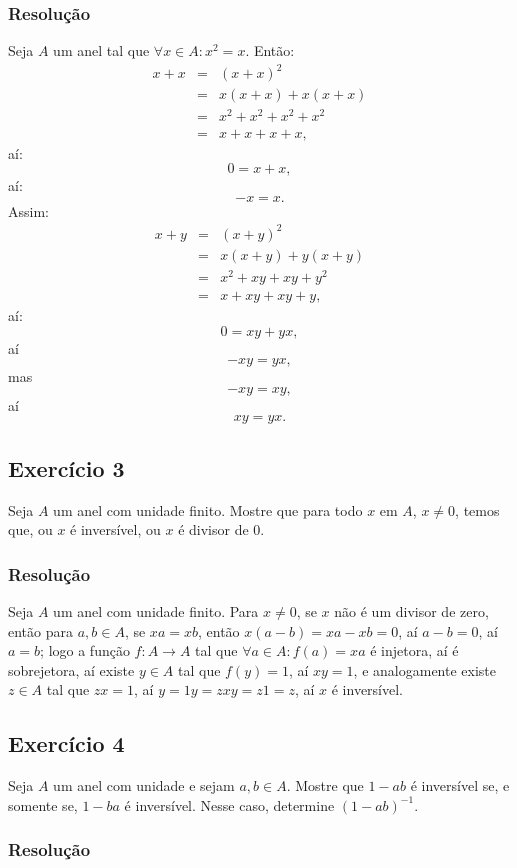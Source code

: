 \documentclass[10pt,a4paper]{article}
\begin{document}
\subsubsection*{Resolução}

Seja $A$ um anel tal que $\forall x\in A:x^2=x$. Então:
\[
\begin{array}{rcl}
x+x&=&(x+x)^2\\&=&x(x+x)+x(x+x)\\&=&x^2+x^2+x^2+x^2\\&=&x+x+x+x,
\end{array}
\]
aí:
\[
0=x+x,
\]
aí:
\[
-x=x.
\]
Assim:
\[
\begin{array}{rcl}
x+y&=&(x+y)^2\\&=&x(x+y)+y(x+y)\\&=&x^2+xy+xy+y^2\\&=&x+xy+xy+y,
\end{array}
\]
aí:
\[
0=xy+yx,
\]
aí
\[
-xy=yx,
\]
mas
\[
-xy=xy,
\]
aí
\[
xy=yx.
\]

\newpage

\subsection*{Exercício 3}
Seja $A$ um anel com unidade finito. Mostre que para todo $x$ em $A$, $x\neq 0$, temos que, ou $x$ é inversível, ou $x$ é divisor de $0$.

\subsubsection*{Resolução}

Seja $A$ um anel com unidade finito. Para $x\neq 0$, se $x$ não é um divisor de zero, então para $a,b\in A$, se $xa=xb$, então $x(a-b)=xa-xb=0$, aí $a-b=0$, aí $a=b$; logo a função $f:A\rightarrow A$ tal que $\forall a\in A:f(a)=xa$ é injetora, aí é sobrejetora, aí existe $y\in A$ tal que $f(y)=1$, aí $xy=1$, e analogamente existe $z\in A$ tal que $zx=1$, aí $y=1y=zxy=z1=z$, aí $x$ é inversível.

\subsection*{Exercício 4}
Seja $A$ um anel com unidade e sejam $a,b\in A$. Mostre que $1-ab$ é inversível se, e somente se, $1-ba$ é inversível. Nesse caso, determine $(1-ab)^{-1}$.

\subsubsection*{Resolução}
\end{document}
